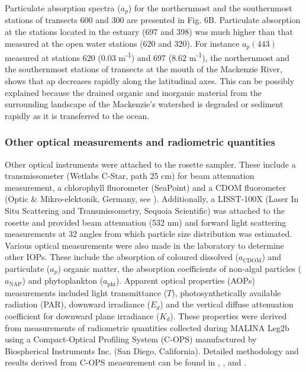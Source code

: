 \documentclass[essd, manuscript]{copernicus}
\begin{document}
Particulate absorption spectra ($a_p$) for the northernmost and the southernmost stations of transects 600 and 300 are presented in Fig. 6B. Particulate absorption at the stations located in the estuary (697 and 398) was much higher than that measured at the open water stations (620 and 320). For instance $a_p(443)$ measured at stations 620 (0.03 m\textsuperscript{-1}) and 697 (8.62 m\textsuperscript{-1}), the northernmost and the southernmost stations of transects at the mouth of the Mackenzie River, shows that ap decreases rapidly along the latitudinal axes. This can be possibly explained because the drained organic and inorganic material from the surrounding landscape of the Mackenzie's watershed is degraded or sediment rapidly as it is transferred to the ocean.

\subsubsection{Other optical measurements and radiometric quantities}

Other optical instruments were attached to the rosette sampler. These include a transmissometer (Wetlabs C-Star, path 25 cm) for beam attenuation measurement, a chlorophyll fluorometer (SeaPoint) and a CDOM fluorometer (Optic \& Mikro-elektonik, Germany, see \citet{Amon2003}). Additionally, a LISST-100X (Laser In Situ Scattering and Transmissometry, Sequoia Scientific) was attached to the rosette and provided beam attenuation (532 nm) and forward light scattering measurements at 32 angles from which particle size distribution was estimated. Various optical measurements were also made in the laboratory to determine other IOPs. These include the absorption of coloured dissolved ($a_\text{CDOM}$) and particulate ($a_p$) organic matter, the absorption coefficients of non-algal particles ($a_\text{NAP}$) and phytoplankton ($a_\text{phi}$). Apparent optical properties (AOPs) measurements included light transmittance ($T$), photosynthetically available radiation (PAR), downward irradiance ($E_d$) and the vertical diffuse attenuation coefficient for downward plane irradiance ($K_d$). These properties were derived from measurements of radiometric quantities collected during MALINA Leg2b using a Compact-Optical Profiling System (C-OPS) manufactured by Biospherical Instruments Inc. (San Diego, California). Detailed methodology and results derived from C-OPS measurement can be found in \citet{Doxaran2012},  \citet{Antoine2013}, \citet{Belanger2013b} and \citet{Hooker2013}.
\end{document}
